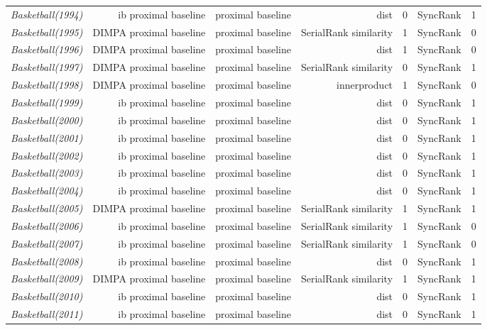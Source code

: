 \documentclass[nohyperref]{article}
\theoremstyle{plain}
\theoremstyle{definition}
\theoremstyle{remark}
\begin{document}
\begin{table*}[!ht]
{\begin{tabular}{lrrrrrr}
			{\it Basketball(1994)} & ib proximal baseline & proximal baseline & dist & 0 & SyncRank & 1 \\
			{\it Basketball(1995)} & DIMPA proximal baseline & proximal baseline & SerialRank similarity & 1 & SyncRank & 0 \\
			{\it Basketball(1996)} & DIMPA proximal baseline & proximal baseline & dist & 1 & SyncRank & 0 \\
			{\it Basketball(1997)} & DIMPA proximal baseline & proximal baseline & SerialRank similarity & 0 & SyncRank & 1 \\
			{\it Basketball(1998)} & DIMPA proximal baseline & proximal baseline & innerproduct & 1 & SyncRank & 0 \\
			{\it Basketball(1999)} & ib proximal baseline & proximal baseline & dist & 0 & SyncRank & 1 \\
			{\it Basketball(2000)} & ib proximal baseline & proximal baseline & dist & 0 & SyncRank & 1 \\
			{\it Basketball(2001)} & ib proximal baseline & proximal baseline & dist & 0 & SyncRank & 1 \\
			{\it Basketball(2002)} & ib proximal baseline & proximal baseline & dist & 0 & SyncRank & 1 \\
			{\it Basketball(2003)} & ib proximal baseline & proximal baseline & dist & 0 & SyncRank & 1 \\
			{\it Basketball(2004)} & ib proximal baseline & proximal baseline & dist & 0 & SyncRank & 1 \\
			{\it Basketball(2005)} & DIMPA proximal baseline & proximal baseline & SerialRank similarity & 1 & SyncRank & 1 \\
			{\it Basketball(2006)} & ib proximal baseline & proximal baseline & SerialRank similarity & 1 & SyncRank & 0 \\
			{\it Basketball(2007)} & ib proximal baseline & proximal baseline & SerialRank similarity & 1 & SyncRank & 0 \\
			{\it Basketball(2008)} & ib proximal baseline & proximal baseline & dist & 0 & SyncRank & 1 \\
			{\it Basketball(2009)} & DIMPA proximal baseline & proximal baseline & SerialRank similarity & 1 & SyncRank & 1 \\
			{\it Basketball(2010)} & ib proximal baseline & proximal baseline & dist & 0 & SyncRank & 1 \\
			{\it Basketball(2011)} & ib proximal baseline & proximal baseline & dist & 0 & SyncRank & 1 \\

\end{tabular}}
\end{table*}
\end{document}
